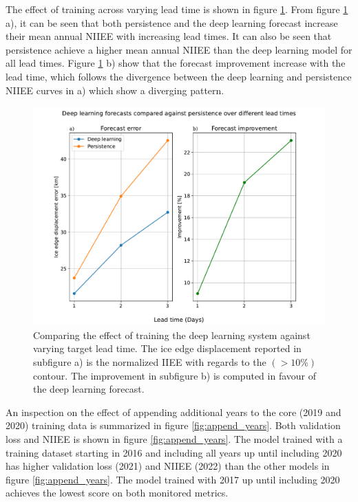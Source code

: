 \documentclass[../main/thesis]{subfiles}
\begin{document}
The effect of training across varying lead time is shown in figure \ref{fig:lead_times}. From figure \ref{fig:lead_times} a), it can be seen that both persistence and the deep learning forecast increase their mean annual NIIEE with increasing lead times. It can also be seen that persistence achieve a higher mean annual NIIEE than the deep learning model for all lead times. Figure \ref{fig:lead_times} b) show that the forecast improvement increase with the lead time, which follows the divergence between the deep learning and persistence NIIEE curves in a) which show a diverging pattern. 

\begin{figure}
    \centering
    \includegraphics[width=\textwidth]{lead_times.pdf}
    \caption{\label{fig:lead_times}Comparing the effect of training the deep learning system against varying target lead time. The ice edge displacement reported in subfigure a) is the normalized IIEE with regards to the $(> 10\%)$ contour. The improvement in subfigure b) is computed in favour of the deep learning forecast.}
\end{figure}

An inspection on the effect of appending additional years to the core (2019 and 2020) training data is summarized in figure \ref{fig:append_years}. Both validation loss and NIIEE is shown in figure \ref{fig:append_years}. The model trained with a training dataset starting in 2016 and including all years up until including 2020 has higher validation loss (2021) and NIIEE (2022) than the other models in figure \ref{fig:append_years}. The model trained with 2017 up until including 2020 achieves the lowest score on both monitored metrics.
\end{document}
